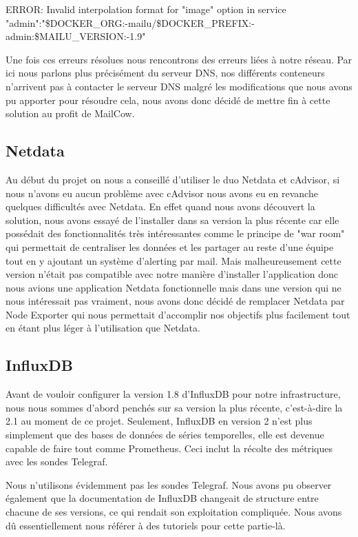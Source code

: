 \documentclass[oneside,12pt]{report}
\begin{document}
 ERROR: Invalid interpolation format for "image" option in service "admin":\newline "\${DOCKER\_ORG:-mailu}/\${DOCKER\_PREFIX:-}admin:\${MAILU\_VERSION:-1.9}"
\newline 

Une fois ces erreurs résolues nous rencontrons des erreurs liées à notre réseau.
Par ici nous parlons plus précisément du serveur DNS, nos différents conteneurs n'arrivent pas à contacter le serveur DNS malgré les modifications que nous avons pu apporter pour résoudre cela, nous avons donc décidé de mettre fin à cette solution au profit de MailCow.

\subsection{Netdata}

Au début du projet on nous a conseillé d'utiliser le duo Netdata et cAdvisor, si nous n'avons eu aucun problème avec cAdvisor nous avons eu en revanche quelques difficultés avec Netdata. En effet quand nous avons découvert la solution, nous avons essayé de l'installer dans sa version la plus récente car elle possédait des fonctionnalités très intéressantes comme le principe de "war room" qui permettait de centraliser les données et les partager au reste d'une équipe tout en y ajoutant un système d'alerting par mail. Mais malheureusement cette version n'était pas compatible avec notre manière d'installer l'application donc nous avions une application Netdata fonctionnelle mais dans une version qui ne nous intéressait pas vraiment, nous avons donc décidé de remplacer Netdata par Node Exporter qui nous permettait d'accomplir nos objectifs plus facilement tout en étant plus léger à l'utilisation que Netdata.

\subsection{InfluxDB}

Avant de vouloir configurer la version 1.8 d'InfluxDB pour notre infrastructure, nous nous sommes d'abord penchés sur sa version la plus récente, c'est-à-dire la 2.1 au moment de ce projet. Seulement, InfluxDB en version 2 n'est plus simplement que des bases de données de séries temporelles, elle est devenue capable de faire tout comme Prometheus. Ceci inclut la récolte des métriques avec les sondes Telegraf.
\newline

Nous n'utilisons évidemment pas les sondes Telegraf. Nous avons pu observer également que la documentation de InfluxDB changeait de structure entre chacune de ses versions, ce qui rendait son exploitation compliquée. Nous avons dû essentiellement nous référer à des tutoriels pour cette partie-là.
\newline
\end{document}
